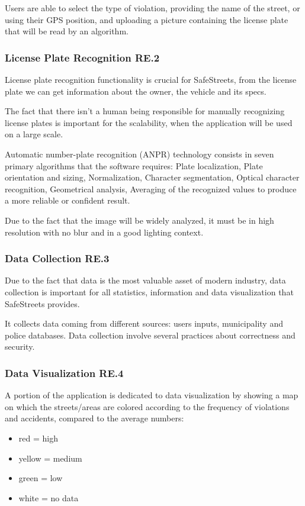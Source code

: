 Users are able to select the type of violation, providing the name of the street, or using their GPS position, and uploading a picture containing the license plate that will be read by an algorithm.

\subsubsection{License Plate Recognition RE.2}
License plate recognition functionality is crucial for SafeStreets, from the license plate we can get information about the owner, the vehicle and its specs.

The fact that there isn't a human being responsible for manually recognizing license plates is important for the scalability, when the application will be used on a large scale.

Automatic number-plate recognition (ANPR) technology consists in seven primary algorithms that the software requires: Plate localization, Plate orientation and sizing, Normalization, Character segmentation, Optical character recognition, Geometrical analysis, Averaging of the recognized values to produce a more reliable or confident result.

Due to the fact that the image will be widely analyzed, it must be in high resolution with no blur and in a good lighting context.

\subsubsection{Data Collection RE.3}
Due to the fact that data is the most valuable asset of modern industry, data collection is important for all statistics, information and data visualization that SafeStreets provides.

It collects data coming from different sources: users inputs, municipality and police databases.
Data collection involve several practices about correctness and security.

\subsubsection{Data Visualization RE.4}
A portion of the application is dedicated to data visualization by showing a map on which the streets/areas are colored according to the frequency of violations and accidents, compared to the average numbers: 
\begin{itemize}
\item red = high
\item yellow = medium
\item green = low
\item white = no data
\end{itemize}

